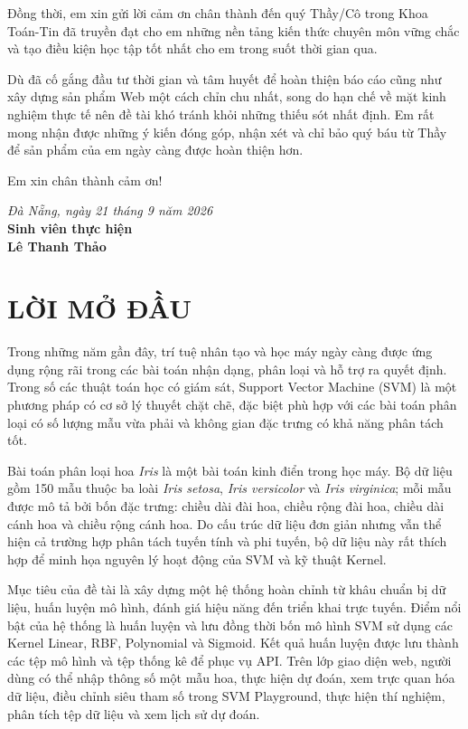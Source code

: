 \documentclass{article}
\begin{document}
	Đồng thời, em xin gửi lời cảm ơn chân thành đến quý Thầy/Cô trong Khoa Toán-Tin đã truyền đạt cho em những nền tảng kiến thức chuyên môn vững chắc và tạo điều kiện học tập tốt nhất cho em trong suốt thời gian qua.
	
	Dù đã cố gắng đầu tư thời gian và tâm huyết để hoàn thiện báo cáo cũng như xây dựng sản phẩm Web một cách chỉn chu nhất, song do hạn chế về mặt kinh nghiệm thực tế nên đề tài khó tránh khỏi những thiếu sót nhất định. Em rất mong nhận được những ý kiến đóng góp, nhận xét và chỉ bảo quý báu từ Thầy để sản phẩm của em ngày càng được hoàn thiện hơn.
	
	Em xin chân thành cảm ơn!
	
	\begin{flushright}
		\textit{Đà Nẵng, ngày 21 tháng 9 năm 2026}\\
		\textbf{Sinh viên thực hiện}\\
		\vspace{1.5cm}
		\textbf{Lê Thanh Thảo}
	\end{flushright}
	\newpage
	
	\section{\centering LỜI MỞ ĐẦU}
	
	\hspace{0.5cm}
	Trong những năm gần đây, trí tuệ nhân tạo và học máy ngày càng được ứng dụng rộng rãi trong các bài toán nhận dạng, phân loại và hỗ trợ ra quyết định. Trong số các thuật toán học có giám sát, Support Vector Machine (SVM) là một phương pháp có cơ sở lý thuyết chặt chẽ, đặc biệt phù hợp với các bài toán phân loại có số lượng mẫu vừa phải và không gian đặc trưng có khả năng phân tách tốt.
	
	Bài toán phân loại hoa \textit{Iris} là một bài toán kinh điển trong học máy. Bộ dữ liệu gồm 150 mẫu thuộc ba loài \textit{Iris setosa}, \textit{Iris versicolor} và \textit{Iris virginica}; mỗi mẫu được mô tả bởi bốn đặc trưng: chiều dài đài hoa, chiều rộng đài hoa, chiều dài cánh hoa và chiều rộng cánh hoa. Do cấu trúc dữ liệu đơn giản nhưng vẫn thể hiện cả trường hợp phân tách tuyến tính và phi tuyến, bộ dữ liệu này rất thích hợp để minh họa nguyên lý hoạt động của SVM và kỹ thuật Kernel.
	
	Mục tiêu của đề tài là xây dựng một hệ thống hoàn chỉnh từ khâu chuẩn bị dữ liệu, huấn luyện mô hình, đánh giá hiệu năng đến triển khai trực tuyến. Điểm nổi bật của hệ thống là huấn luyện và lưu đồng thời bốn mô hình SVM sử dụng các Kernel Linear, RBF, Polynomial và Sigmoid. Kết quả huấn luyện được lưu thành các tệp mô hình và tệp thống kê để phục vụ API. Trên lớp giao diện web, người dùng có thể nhập thông số một mẫu hoa, thực hiện dự đoán, xem trực quan hóa dữ liệu, điều chỉnh siêu tham số trong SVM Playground, thực hiện thí nghiệm, phân tích tệp dữ liệu và xem lịch sử dự đoán.
	
\end{document}
